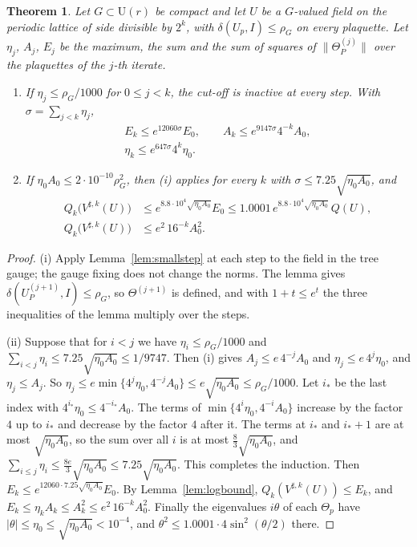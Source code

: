 \documentclass[11pt]{amsart}
\newtheorem{theorem}{Theorem}[section]
\theoremstyle{definition}
\theoremstyle{remark}
\numberwithin{equation}{section}
\newcommand{\U}{\mathrm{U}}
\begin{document}
\begin{theorem}\label{thm:smallscales}
Let $G\subset\U(r)$ be compact and let $U$ be a $G$-valued field on the
periodic lattice of side divisible by $2^k$, with $\delta(U_p,I)\le\rho_G$
on every plaquette. Let $\eta_j$, $A_j$, $E_j$ be the maximum, the sum and
the sum of squares of $\lVert\Theta^{(j)}_P\rVert$ over the plaquettes of
the $j$-th iterate.
\begin{enumerate}[label=\textup{(\roman*)},leftmargin=*]
\item If $\eta_j\le\rho_G/1000$ for $0\le j<k$, the cut-off is inactive at
every step. With $\sigma=\sum_{j<k}\eta_j$,
\begin{gather*}
E_k\le e^{12060\sigma}E_0,\qquad A_k\le e^{9147\sigma}4^{-k}A_0,\\
\eta_k\le e^{647\sigma}4^k\eta_0 .
\end{gather*}
\item If $\eta_0A_0\le2\cdot10^{-10}\rho_G^2$, then (i) applies for every
$k$ with $\sigma\le7.25\sqrt{\eta_0A_0}$, and
\begin{align*}
Q_k\bigl(V^{\sharp,k}(U)\bigr)&\le e^{8.8\cdot10^4\sqrt{\eta_0A_0}}E_0
\le1.0001\,e^{8.8\cdot10^4\sqrt{\eta_0A_0}}\,Q(U),\\
Q_k\bigl(V^{\sharp,k}(U)\bigr)&\le e^2\,16^{-k}A_0^2 .
\end{align*}
\end{enumerate}
\end{theorem}

\begin{proof}
(i) Apply Lemma~\ref{lem:smallstep} at each step to the field in the tree
gauge; the gauge fixing does not change the norms. The lemma gives
$\delta(U^{(j+1)}_P,I)\le\rho_G$, so $\Theta^{(j+1)}$ is defined, and with
$1+t\le e^t$ the three inequalities of the lemma multiply over the steps.

(ii) Suppose that for $i<j$ we have $\eta_i\le\rho_G/1000$ and $\sum_{i<j}
\eta_i\le7.25\sqrt{\eta_0A_0}\le1/9747$. Then (i) gives $A_j\le e\,4^{-j}
A_0$ and $\eta_j\le e\,4^j\eta_0$, and $\eta_j\le A_j$. So $\eta_j\le e\min
\{4^j\eta_0,4^{-j}A_0\}\le e\sqrt{\eta_0A_0}\le\rho_G/1000$. Let $i_*$ be the
last index with $4^{i_*}\eta_0\le4^{-i_*}A_0$. The terms of $\min\{4^i\eta_0,
4^{-i}A_0\}$ increase by the factor $4$ up to $i_*$ and decrease by the
factor $4$ after it. The terms at $i_*$ and $i_*+1$ are at most $\sqrt{
\eta_0A_0}$, so the sum over all $i$ is at most $\frac83\sqrt{\eta_0A_0}$,
and $\sum_{i\le j}\eta_i\le\frac{8e}3\sqrt{\eta_0A_0}\le7.25\sqrt{\eta_0
A_0}$. This completes the induction. Then $E_k\le e^{12060\cdot7.25\sqrt{
\eta_0A_0}}E_0$. By Lemma~\ref{lem:logbound}, $Q_k(V^{\sharp,k}(U))\le E_k$,
and $E_k\le\eta_kA_k\le A_k^2\le e^2\,16^{-k}A_0^2$. Finally the eigenvalues
$i\theta$ of each $\Theta_p$ have $|\theta|\le\eta_0\le\sqrt{\eta_0A_0}<
10^{-4}$, and $\theta^2\le1.0001\cdot4\sin^2(\theta/2)$ there.
\end{proof}
\end{document}

